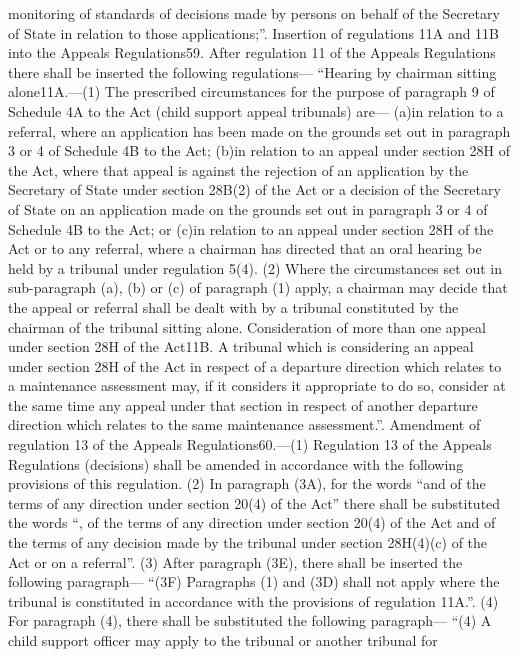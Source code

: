 \documentclass[a4paper]{article}
\begin{document}
monitoring of standards of decisions made by persons on behalf of the Secretary
of State in relation to those applications;”.
Insertion of regulations 11A and 11B into the Appeals Regulations59. After
regulation 11 of the Appeals Regulations there shall be inserted the following
regulations—
“Hearing by chairman sitting alone11A.—(1) The prescribed circumstances for the
purpose of paragraph 9 of Schedule 4A to the Act (child support appeal
tribunals) are—
(a)in relation to a referral, where an application has been made on the grounds
set out in paragraph 3 or 4 of Schedule 4B to the Act;
(b)in relation to an appeal under section 28H of the Act, where that appeal is
against the rejection of an application by the Secretary of State under section
28B(2) of the Act or a decision of the Secretary of State on an application made
on the grounds set out in paragraph 3 or 4 of Schedule 4B to the Act; or
(c)in relation to an appeal under section 28H of the Act or to any referral,
where a chairman has directed that an oral hearing be held by a tribunal under
regulation 5(4).
(2) Where the circumstances set out in sub-paragraph (a), (b) or (c) of
paragraph (1) apply, a chairman may decide that the appeal or referral shall be
dealt with by a tribunal constituted by the chairman of the tribunal sitting
alone.
Consideration of more than one appeal under section 28H of the Act11B. A
tribunal which is considering an appeal under section 28H of the Act in respect
of a departure direction which relates to a maintenance assessment may, if it
considers it appropriate to do so, consider at the same time any appeal under
that section in respect of another departure direction which relates to the same
maintenance assessment.”.
Amendment of regulation 13 of the Appeals Regulations60.—(1) Regulation 13 of
the Appeals Regulations (decisions) shall be amended in accordance with the
following provisions of this regulation.
(2) In paragraph (3A), for the words “and of the terms of any direction under
section 20(4) of the Act” there shall be substituted the words “, of the terms
of any direction under section 20(4) of the Act and of the terms of any decision
made by the tribunal under section 28H(4)(c) of the Act or on a referral”.
(3) After paragraph (3E), there shall be inserted the following paragraph—
“(3F) Paragraphs (1) and (3D) shall not apply where the tribunal is constituted
in accordance with the provisions of regulation 11A.”.
(4) For paragraph (4), there shall be substituted the following paragraph—
“(4) A child support officer may apply to the tribunal or another tribunal for
\end{document}
